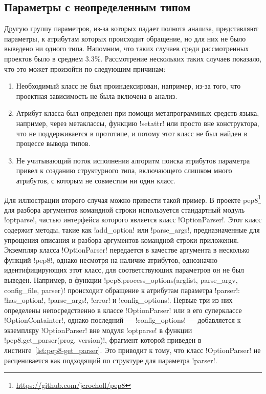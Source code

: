 \subsection{Параметры с неопределенным типом}
\label{sub:undefined-type-parameters}

Другую группу параметров, из-за которых падает полнота анализа, представляют
параметры, к атрибутам которых происходит обращение, но для них не было выведено
ни одного типа. Напомним, что таких случаев среди рассмотренных проектов было в
среднем 3.3\%. Рассмотрение нескольких таких случаев показало, что это может произойти
по следующим причинам:

\begin{enumerate}
    \item Необходимый класс не был проиндексирован, например, из-за того, что
      проектная зависимость не была включена в анализ.

    \item Атрибут класса был определен при помощи метапрограммных средств языка,
      например, через метаклассы, функцию !setattr! или просто
      вне конструктора, что не поддерживается в прототипе, и потому этот класс не был
      найден в процессе вывода типов.

    \item Не учитывающий поток исполнения алгоритм поиска атрибутов параметра
      привел к созданию структурного типа, включающего слишком много
      атрибутов, с которым не совместим ни один класс.

\end{enumerate}

Для иллюстрации второго случая можно привести такой пример. В проекте
pep8\footnote{\url{https://github.com/jcrocholl/pep8}} для разбора аргументов
командной строки используется стандартный модуль !optparse!, частью интерфейса
которого является класс !OptionParser!. Этот класс содержит методы, такие как
!add_option! или !parse_args!, 
предназначенные для упрощения описания и разбора аргументов командной строки
приложения. Экземпляр класса !OptionParser! передается в качестве аргумента в
несколько функций !pep8!, однако несмотря на наличие атрибутов, однозначно
идентифицирующих этот класс, для соответствующих параметров он не был выведен.
Например, в функции !pep8.process_options(arglist, parse_argv, config_file, parser)!
происходит обращение к атрибутам параметра
!parser!: !has_option!, !parse_args!, !error! и !config_options!. Первые три из
них определены непосредственно в классе !OptionParser! или в его суперклассе
!OptionContainter!, однако последний --- !config_options! --- добавляется к
экземпляру !OptionParser! вне модуля !optparse! в функции
!pep8.get_parser(prog, version)!, фрагмент которой приведен в
листинге~\ref{lst:pep8-get_parser}. Это приводит к тому, что класс
!OptionParser! не расценивается как подходящий по структуре для параметра
!parser!.

